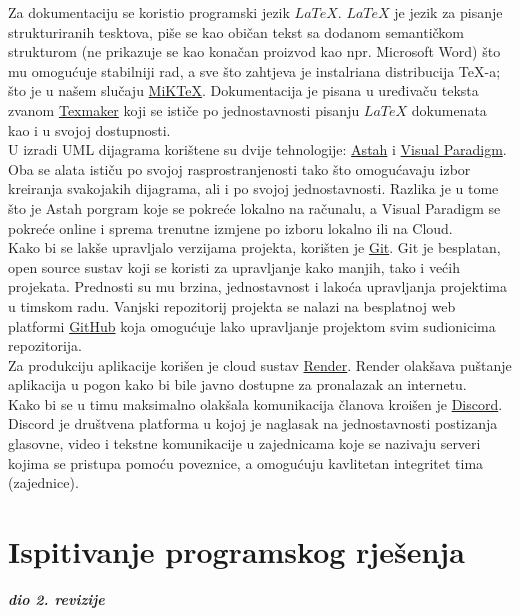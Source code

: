 			Za dokumentaciju se koristio programski jezik \href{https://www.latex-project.org//}{$LaTeX$}. $LaTeX$ je jezik za pisanje strukturiranih tesktova, piše se kao običan tekst sa dodanom semantičkom strukturom (ne prikazuje se kao konačan proizvod kao npr. Microsoft Word) što mu omogućuje stabilniji rad, a sve što zahtjeva je instalriana distribucija TeX-a; što je u našem slučaju \href{https://miktex.org/}{MiKTeX}. Dokumentacija je pisana u uređivaču teksta zvanom \href{https://www.xm1math.net/texmaker/}{Texmaker} koji se ističe po jednostavnosti pisanju $LaTeX$ dokumenata kao i u svojoj dostupnosti.\\
			U izradi UML dijagrama korištene su dvije tehnologije: \href{https://astah.net/}{Astah} i \href{https://www.visual-paradigm.com/}{Visual Paradigm}. Oba se alata ističu po svojoj rasprostranjenosti tako što omogućavaju izbor kreiranja svakojakih dijagrama, ali i po svojoj jednostavnosti. Razlika je u tome što je Astah porgram koje se pokreće lokalno na računalu, a Visual Paradigm se pokreće online i sprema trenutne izmjene po izboru lokalno ili na Cloud.\\
			Kako bi se lakše upravljalo verzijama projekta, korišten je \href{https://git-scm.com/}{Git}. Git je besplatan, open source sustav koji se koristi za upravljanje kako manjih, tako i većih projekata. Prednosti su mu brzina, jednostavnost i lakoća upravljanja projektima u timskom radu. Vanjski repozitorij projekta se nalazi na besplatnoj web platformi \href{https://github.com/}{GitHub} koja omogućuje lako upravljanje projektom svim sudionicima repozitorija. \\
			Za produkciju aplikacije korišen je cloud sustav \href{https://render.com/}{Render}. Render olakšava puštanje aplikacija u pogon kako bi bile javno dostupne za pronalazak an internetu. \\
			Kako bi se u timu maksimalno olakšala komunikacija članova kroišen je \href{https://discord.com/}{Discord}. Discord je društvena platforma u kojoj je naglasak na jednostavnosti postizanja glasovne, video i tekstne komunikacije u zajednicama koje se nazivaju serveri kojima se pristupa pomoću poveznice, a omogućuju kavlitetan integritet tima (zajednice).
			\eject 
		
	
		\section{Ispitivanje programskog rješenja}
			
			\textbf{\textit{dio 2. revizije}}\\
			
